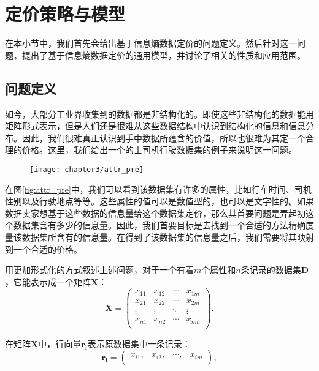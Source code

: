 \section{定价策略与模型}

在本小节中，我们首先会给出基于信息熵数据定价的问题定义。然后针对这一问题，提出了基于信息熵数据定价的通用模型，并讨论了相关的性质和应用范围。

\subsection{问题定义}

如今，大部分工业界收集到的数据都是非结构化的。即使这些非结构化的数据能用矩阵形式表示，但是人们还是很难从这些数据结构中认识到结构化的信息和信息分布。因此，我们很难真正认识到手中数据所蕴含的价值，所以也很难为其定一个合理的价格。这里，我们给出一个的士司机行驶数据集的例子来说明这一问题。

\begin{figure}[h]
  \centering
    \texttt{[image: chapter3/attr\_pre]}
\end{figure}

在图\ref{fig:attr_pre}中，我们可以看到该数据集有许多的属性，比如行车时间、司机性别以及行驶地点等等。这些属性的值可以是数值型的，也可以是文字性的。如果数据卖家想基于这些数据的信息量给这个数据集定价，那么其首要问题是弄起初这个数据集含有多少的信息量。因此，我们首要目标是去找到一个合适的方法精确度量该数据集所含有的信息量。在得到了该数据集的信息量之后，我们需要将其映射到一个合适的价格。

用更加形式化的方式叙述上述问题，对于一个有着$m$个属性和$n$条记录的数据集$\bm{D}$，它能表示成一个矩阵$\bm{X}$：
\begin{equation}
\bm{X}=
\left(
\begin{matrix}
 x_{11}      &  x_{12}      & \cdots &  x_{1m}      \\
 x_{21}     &  x_{22}      & \cdots &  x_{2m}      \\
 \vdots & \vdots & \ddots & \vdots \\
  x_{n1}      &  x_{n2}      & \cdots &  x_{nm}      \\
\end{matrix}
\right).
\end{equation}

在矩阵$\bm{X}$中，行向量$\bm{r_i}$表示原数据集中一条记录：
\begin{equation}
\bm{r_i}=\left(
\begin{matrix}
 x_{i1},      &x_{i2},      &\cdots, &x_{im}      \\
\end{matrix}
\right),
\end{equation}

